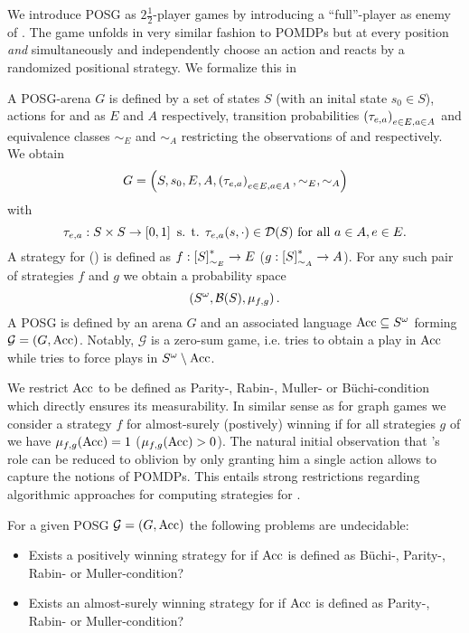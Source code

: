 We introduce \ac{POSG} as $2\frac{1}{2}$-player games by introducing a
\enquote{full}-player \adam{} as enemy of \eve{}. The game unfolds in very
similar fashion to \acp{POMDP} but at every position \eve{} \emph{and} \adam{}
simultaneously and independently choose an action and \random{} reacts by a
randomized positional strategy. We formalize this in
\begin{definition}
  A \ac{POSG}-arena $G$ is defined by a set of states $S$ (with an 
  inital state $s_{0}\in S$), actions for \eve{} and \adam{} as $E$ and $A$ 
  respectively, transition probabilities $\left(\tau_{e,a}\right)_{e\in E, a\in A}$ 
  and equivalence classes $\sim_{E}$ and $\sim_{A}$ restricting the 
  observations of \eve{} and \adam{} respectively. We obtain
  \begin{equation*}
    G = \left(S, s_{0}, E, A, \left(\tau_{e,a}\right)_{e\in E, a\in A}, 
    \sim_{E}, \sim_{A}\right)
  \end{equation*}
  with
  \begin{equation*}
    \tau_{e,a}:S\times S\rightarrow\left[0,1\right] \text{ s. t. }
    \tau_{e,a}(s, \cdot)\in\mathcal{D}(S)\text{ for all }a\in A, e\in E.
  \end{equation*}
  A strategy for \eve{} (\adam{}) is defined as 
  $f:\left[S\right]_{\sim_{E}}^{*}\rightarrow E$ 
  ($g:\left[S\right]_{\sim_{A}}^{*}\rightarrow A$). For any such pair of 
  strategies $f$ and $g$ we obtain a probability space
  \begin{equation*}
    \left(S^{\omega}, \mathcal{B}(S), \mu_{f, g}\right).
  \end{equation*}
  A \ac{POSG} is defined by an arena $G$ and an associated language
  $\operatorname{Acc}\subseteq S^{\omega}$ forming $\mathcal{G} = \left(G, \operatorname{Acc}\right)$. Notably,
  $\mathcal{G}$ is a zero-sum game, i.e. \eve{} tries to obtain a play in 
  $\operatorname{Acc}$ while \adam{} tries to force plays in $S^{\omega}\setminus\operatorname{Acc}$.
\end{definition}
We restrict $\operatorname{Acc}$ to be defined as Parity-, Rabin-, Muller-
or Büchi-condition which directly ensures its measurability. In similar sense
as for graph games we consider a strategy $f$ for \eve{} almost-surely
(postively) winning if for all strategies $g$ of \adam{} we have
$\mu_{f,g}(\operatorname{Acc}) = 1$ ($\mu_{f,g}(\operatorname{Acc}) > 0$). The natural initial observation
that \adam{}'s role can be reduced to oblivion by only granting him a single
action allows to capture the notions of \acp{POMDP}. This entails strong
restrictions regarding algorithmic approaches for computing strategies for
\eve{}.
\begin{corollary}
  \cite{PureStratPOSG, POSG}
  For a given \ac{POSG} $\mathcal{G} = \left(G, \operatorname{Acc}\right)$ the following problems
  are undecidable:
  \begin{itemize}
    \item Exists a positively winning strategy for \eve{} if $\operatorname{Acc}$ is defined 
      as Büchi-, Parity-, Rabin- or Muller-condition?
    \item Exists an almost-surely winning strategy for \eve{} if $\operatorname{Acc}$ is
      defined as Parity-, Rabin- or Muller-condition?
  \end{itemize}
\end{corollary}
